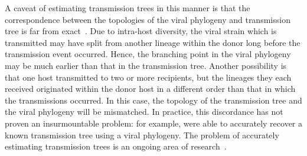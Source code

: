 A caveat of estimating transmission trees in this manner is that the
correspondence between the topologies of the viral phylogeny and transmission
tree is far from exact~\autocite{ypma2013relating, romero2014timing}.  Due to
intra-host diversity, the viral strain which is transmitted may have split from
another lineage within the donor long before the transmission event occurred.
Hence, the branching point in the viral phylogeny may be much earlier than that
in the transmission tree. Another possibility is that one host transmitted to
two or more recipients, but the lineages they each received originated within
the donor host in a different order than that in which the transmissions
occurred.  In this case, the topology of the transmission tree and the viral
phylogeny will be mismatched. In practice, this discordance has not proven an
insurmountable problem: for example, \textcite{leitner1996accurate,
paraskevis2004phylogenetic} were able to accurately recover a known
transmission tree using a viral phylogeny. The problem of accurately estimating
transmission trees is an ongoing area of
research~\autocite{cottam2008integrating, jombart2011reconstructing,
ypma2012unravelling, morelli2012bayesian, didelot2014bayesian}.


